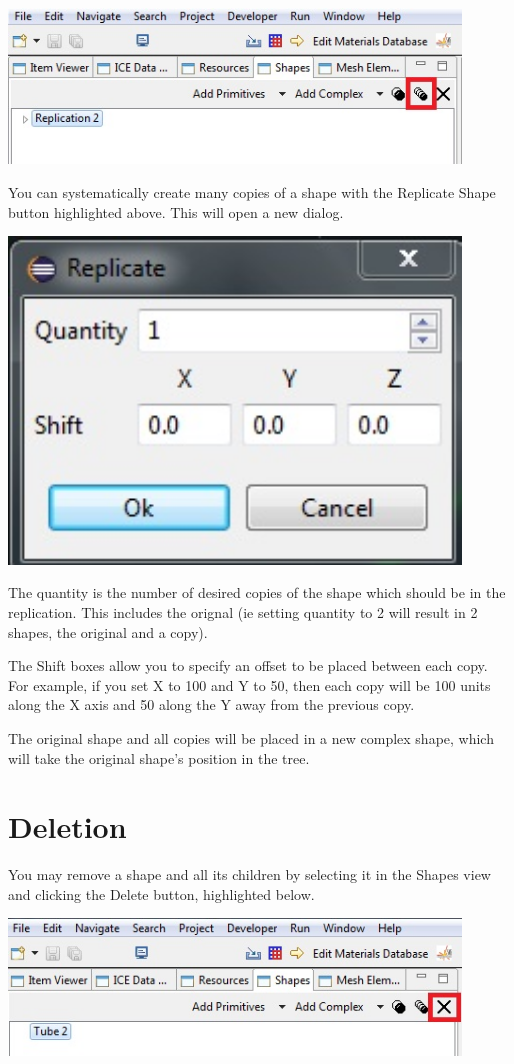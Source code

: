 \documentclass{article}
\begin{document}
\begin{center}
\includegraphics[width=12cm]{images/GeometryReplicateShape.jpg}
\end{center}

You can systematically create many copies of a shape with the Replicate Shape
button highlighted above. This will open a new dialog.

\begin{center}
\includegraphics[width=12cm]{images/GeometryReplicateDialog.jpg}
\end{center}

The quantity is the number of desired copies of the shape which should be in the
replication. This includes the orignal (ie setting quantity to 2 will result in
2 shapes, the original and a copy).

The Shift boxes allow you to specify an offset to be placed between each copy.
For example, if you set X to 100 and Y to 50, then each copy will be 100 units
along the X axis and 50 along the Y away from the previous copy. 

The original shape and all copies will be placed in a new complex shape, which
will take the original shape's position in the tree.

\section{Deletion}

You may remove a shape and all its children by selecting it in the Shapes view
and clicking the Delete button, highlighted below.

\begin{center}
\includegraphics[width=12cm]{images/GeometryDeleteButton.jpg}
\end{center}
\end{document}
